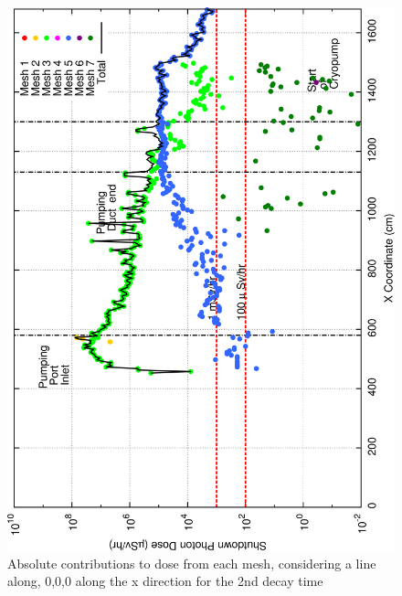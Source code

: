 \documentclass[12pt]{article}
\begin{document}
\begin{figure}[ht!]
\centering
\includegraphics[clip,scale=0.25]{../plots/crosstalk/b4c/lp/dc2.png}
\caption{Absolute contributions to dose from each mesh, considering a line along, 0,0,0 along the x direction for the 2nd decay time}
\label{fig:b4c_ct_lp_dc2}
\end{figure}
\end{document}

